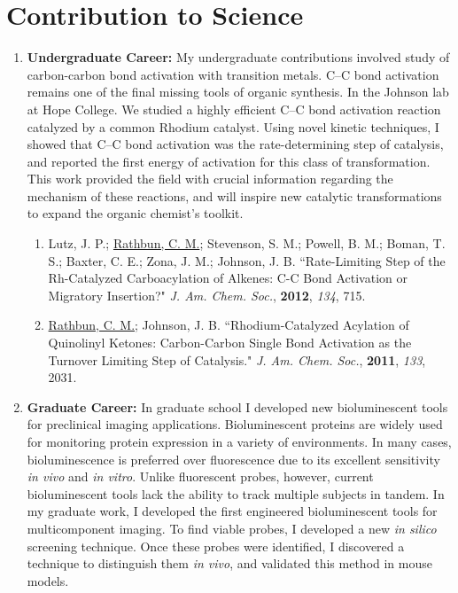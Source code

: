 \documentclass{nihbiosketch}
\begin{document}
\section{Contribution to Science}

\begin{enumerate}

\item \textbf{Undergraduate Career:} My undergraduate contributions involved study of carbon-carbon bond activation with transition metals. C--C bond activation remains one of the final missing tools of organic synthesis. In the Johnson lab at Hope College. We studied a highly efficient C--C bond activation reaction catalyzed by a common Rhodium catalyst. Using novel kinetic techniques, I showed that C--C bond activation was the rate-determining step of catalysis, and reported the first energy of activation for this class of transformation. This work provided the field with crucial information regarding the mechanism of these reactions, and will inspire new catalytic transformations to expand the organic chemist's toolkit.

\begin{enumerate}

  \item Lutz, J. P.; \underline{Rathbun, C. M.}; Stevenson, S. M.; Powell, B. M.; Boman, T. S.; Baxter, C. E.; Zona, J. M.; Johnson, J. B. ``Rate-Limiting Step of the Rh-Catalyzed Carboacylation of Alkenes: C-C Bond Activation or Migratory Insertion?" \textit{J. Am. Chem. Soc.}, \textbf{2012}, \textit{134}, 715.

  \item \underline{Rathbun, C. M.}; Johnson, J. B. ``Rhodium-Catalyzed Acylation of Quinolinyl Ketones: Carbon-Carbon Single Bond Activation as the Turnover Limiting Step of Catalysis." \textit{J. Am. Chem. Soc.}, \textbf{2011}, \textit{133}, 2031.

\end{enumerate}


\item \textbf{Graduate Career:} In graduate school I developed new bioluminescent tools for preclinical imaging applications. Bioluminescent proteins are widely used for monitoring protein expression in a variety of environments. In many cases, bioluminescence is preferred over fluorescence due to its excellent sensitivity \textit{in vivo} and \textit{in vitro}. Unlike fluorescent probes, however, current bioluminescent tools lack the ability to track multiple subjects in tandem. In my graduate work, I developed the first engineered bioluminescent tools for multicomponent imaging. To find viable probes, I developed a new \textit{in silico} screening technique. Once these probes were identified, I discovered a technique to distinguish them \textit{in vivo}, and validated this method in mouse models.


\end{enumerate}
\end{document}
